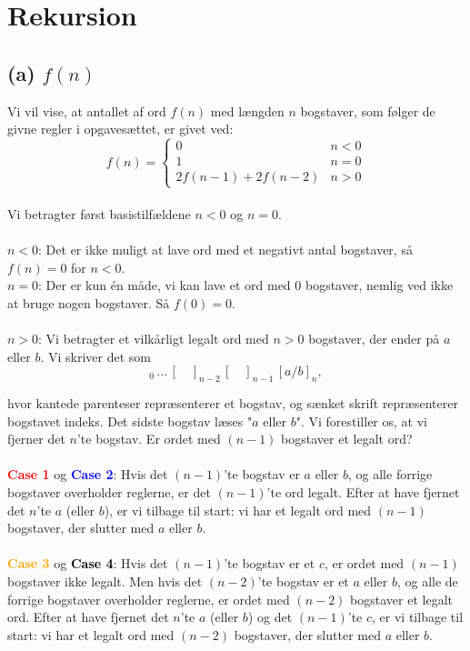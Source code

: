 \section{Rekursion}

\subsection*{(a) $f(n)$}

Vi vil vise, at antallet af ord $f(n)$ med længden $n$ bogstaver, som følger de givne regler i opgavesættet, er givet ved:
\[ f(n) = \begin{cases} 
      0 & n < 0 \\
      1 & n = 0 \\
      2 f(n-1) + 2 f(n-2) & n > 0
   \end{cases}
\]
\\

Vi betragter først basistilfældene $n<0$ og $n=0$.\\
\\
$n<0$: Det er ikke muligt at lave ord med et negativt antal bogstaver, så $f(n)=0$ for $n<0$.\\
$n=0$: Der er kun én måde, vi kan lave et ord med 0 bogstaver, nemlig ved ikke at bruge nogen bogstaver. Så $f(0)=0$.\\
\\
$n>0$: Vi betragter et vilkårligt legalt ord med $n>0$ bogstaver, der ender på $a$ eller $b$. Vi skriver det som
\begin{equation}
    [\quad]_0 \, ... \, [\quad]_{n-2} \, [\quad]_{n-1} \, [a/b]_n, 
\end{equation}

hvor kantede parenteser repræsenterer et bogstav, og sænket skrift repræsenterer bogstavet indeks. Det sidste bogstav læses "$a$ eller $b$". Vi forestiller os, at vi fjerner det $n$'te bogstav. Er ordet med $(n-1)$ bogstaver et legalt ord?\\
\\
\textcolor{red}{\textbf{Case 1}} og \textcolor{blue}{\textbf{Case 2}}: Hvis det $(n-1)$'te bogstav er $a$ eller $b$, og alle forrige bogstaver overholder reglerne, er det $(n-1)$'te ord legalt. Efter at have fjernet det $n$'te $a$ (eller $b$), er vi tilbage til start: vi har et legalt ord med $(n-1)$ bogstaver, der slutter med $a$ eller $b$.\\
\\
\textcolor{orange}{\textbf{Case 3}} og \textcolor{black}{\textbf{Case 4}}: Hvis det $(n-1)$'te bogstav er et $c$, er ordet med $(n-1)$ bogstaver ikke legalt. Men hvis det $(n-2)$'te bogstav er et $a$ eller $b$, og alle de forrige bogstaver overholder reglerne, er ordet med $(n-2)$ bogstaver et legalt ord. Efter at have fjernet det $n$'te $a$ (eller $b$) og det $(n-1)$'te $c$, er vi tilbage til start: vi har et legalt ord med $(n-2)$ bogstaver, der slutter med $a$ eller $b$.

